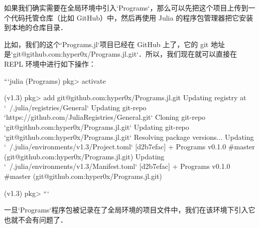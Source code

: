 如果我们确实需要在全局环境中引入`Programs`，那么可以先把这个项目上传到一个代码托管仓库（比如 GitHub）中，然后再使用 Julia 的程序包管理器把它安装到本地的仓库目录． 

比如，我们的这个`Programs.jl`项目已经在 GitHub 上了，它的 git 地址是`git@github.com:hyper0x/Programs.jl.git`．所以，我们现在就可以直接在 REPL 环境中进行如下操作：

```julia
(Programs) pkg> activate

(v1.3) pkg> add git@github.com:hyper0x/Programs.jl.git
  Updating registry at `~/.julia/registries/General`
  Updating git-repo `https://github.com/JuliaRegistries/General.git`
   Cloning git-repo `git@github.com:hyper0x/Programs.jl.git`
  Updating git-repo `git@github.com:hyper0x/Programs.jl.git`
 Resolving package versions...
  Updating `~/.julia/environments/v1.3/Project.toml`
  [d2b7efac] + Programs v0.1.0 #master (git@github.com:hyper0x/Programs.jl.git)
  Updating `~/.julia/environments/v1.3/Manifest.toml`
  [d2b7efac] + Programs v0.1.0 #master (git@github.com:hyper0x/Programs.jl.git)

(v1.3) pkg> 
```

一旦`Programs`程序包被记录在了全局环境的项目文件中，我们在该环境下引入它也就不会有问题了．